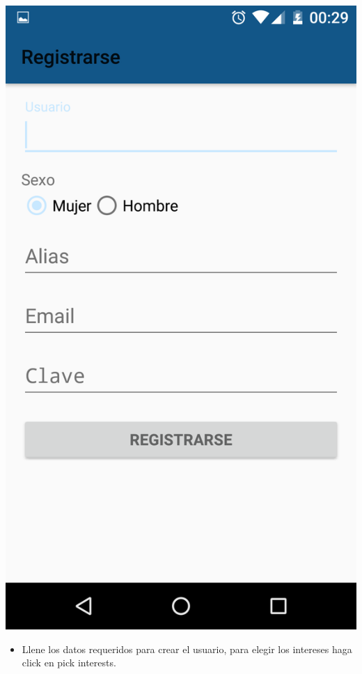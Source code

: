 \documentclass[letterpaper,10pt,english]{sphinxmanual}
\begin{document}
\includegraphics{registro.png}
\begin{itemize}
\item {} 
Llene los datos requeridos para crear el usuario, para elegir los intereses haga click en pick interests.

\end{itemize}
\end{document}
